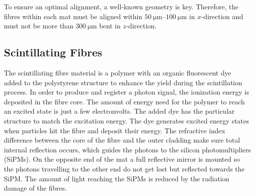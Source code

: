 To ensure an optimal alignment, a well-known geometry is key. Therefore, the
fibres within each mat must be aligned within $\SIrange{50}{100}{\micro\metre}$ in $x$-direction and must not be more than $\SI{300}{\micro\metre}$ bent in $z$-direction.

\subsection{Scintillating Fibres}
The scintillating fibre material is a polymer with an organic fluorescent dye
added to the polystyrene structure to enhance the yield during the scintillation process.
In order to produce and register a photon signal, the ionization energy is deposited
in the fibre core. The amount of energy need for the polymer to reach an
excited state is just a few electronvolts\cite{Elevel}. The added dye has the particular structure
to match the excitation energy. The dye generates excited energy states when
particles hit the fibre and deposit their energy.
The refractive index difference between the core of the fibre and the outer cladding make sure total internal reflection occurs, which guides the photons to the silicon photomultipliers (SiPMs).
On the opposite end of the mat a full reflective mirror is mounted so the photons travelling to the other end do not get lost but reflected towards the SiPM.
The amount of light reaching the SiPMs is reduced by the radiation damage of the fibres.
